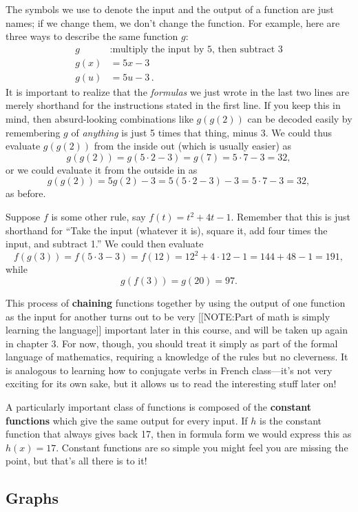 The symbols we use to denote the input and the output of a function
are just names; if we change them, we don't change the function.  For
example, here are three ways to describe the same function $g$:
\begin{align*}
g &: \mbox{multiply the input by 5, then subtract 3} \\
g(x) &= 5x - 3 \\
g(u) &= 5u - 3 \, .
\end{align*}
It is important to realize that the {\em formulas} we just wrote in
the last two lines are merely shorthand for the instructions stated in
the first line.  If you keep this in mind, then absurd-looking
combinations like $g(g(2))$ can be decoded easily by remembering $g$
of {\em anything} is just 5 times that thing, minus 3.  We could thus
evaluate $g(g(2))$ from the inside out (which is usually easier) as
\[
g(g(2))=g(5\cdot 2-3)=g(7)=5\cdot 7 -3=32,
\]
or we could evaluate it from the outside in as  
\[
g(g(2))=5g(2)-3=5(5\cdot 2 -3)-3=5\cdot 7-3=32,
\] 
as before. 

Suppose $f$ is some other rule, say $f(t)=t^2+4t-1$.  Remember that
this is just shorthand for ``Take the input (whatever it is), square
it, add four times the input, and subtract 1.''  We could then
evaluate
\[
f(g(3))=f(5\cdot 3 -3)=f(12)= 12^2+4\cdot 12 - 1 = 144+48-1=191,
\]
while 
\[
g(f(3))=g(20)=97.
\] 

This process of {\bf chaining} functions together by using the output
of one function as the input for another turns out to be very
[[NOTE:Part of math is simply learning the language]] important later in
this course, and will be taken up again in chapter 3.  For now,
though, you should treat it simply as part of the formal language of
mathematics, requiring a knowledge of the rules but no cleverness.  It
is analogous to learning how to conjugate verbs in French class---it's
not very exciting for its own sake, but it allows us to read the
interesting stuff later on!

A particularly important class of functions is composed of the {\bf
  constant functions} which give the same output for every input.  If
$h$ is the constant function that always gives back 17, then in
formula form we would express this as $h(x) = 17$.  Constant functions
are so simple you might feel you are missing the point, but that's all
there is to it!

\subsection{Graphs}
\label{subsec:graphs}

